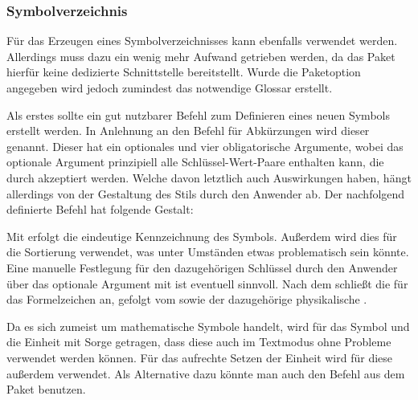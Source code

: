 \documentclass[%
  english,ngerman,%
  geometry=no,DIV=12,automark,%
]{tudscrartcl}
\begin{document}
\subsubsection{Symbolverzeichnis}
Für das Erzeugen eines Symbolverzeichnisses kann ebenfalls  
verwendet werden. Allerdings muss dazu ein wenig mehr Aufwand getrieben werden, 
da das Paket hierfür keine dedizierte Schnittstelle bereitstellt. Wurde die 
Paketoption  angegeben wird jedoch zumindest das notwendige 
Glossar erstellt.

Als erstes sollte ein gut nutzbarer Befehl zum Definieren eines neuen Symbols 
erstellt werden. In Anlehnung an den Befehl für Abkürzungen wird dieser 
 genannt. Dieser hat ein optionales und vier obligatorische 
Argumente, wobei das optionale Argument prinzipiell alle Schlüssel-Wert-Paare 
enthalten kann, die durch  akzeptiert werden. Welche davon 
letztlich auch Auswirkungen haben, hängt allerdings von der Gestaltung des 
Stils durch den Anwender ab. Der nachfolgend definierte Befehl hat folgende 
Gestalt:
%
\begin{quoting}[leftmargin=\parindent]
\LParameter{}%
\end{quoting}
%
Mit  erfolgt die eindeutige Kennzeichnung des Symbols. Außerdem 
wird dies für die Sortierung verwendet, was unter Umständen etwas problematisch 
sein könnte. Eine manuelle Festlegung für den dazugehörigen Schlüssel durch den 
Anwender über das optionale Argument mit  ist 
eventuell sinnvoll. Nach dem  schließt die  für 
das Formelzeichen an, gefolgt vom  sowie der dazugehörige 
physikalische .
%
\CodeHook{\let\newcommand\renewcommand}
\begin{Preamble*}
\newcommand*{\newsymbol}[5][]{%
  \newglossaryentry{#2}{%
    type=symbols,%
    description={},%
    name={#3},%
    symbol={\ensuremath{#4}},%
    user1={\ensuremath{\mathrm{#5}}},%
    sort={#2},%
    #1%
  }%
}

\end{Preamble*}
%
Da es sich zumeist um mathematische Symbole handelt, wird für das Symbol und 
die Einheit mit  Sorge getragen, dass diese auch im 
Textmodus ohne Probleme verwendet werden können. Für das aufrechte Setzen der 
Einheit wird für diese außerdem  verwendet. Als Alternative dazu 
könnte man auch den Befehl  aus dem Paket  benutzen. 
\end{document}
